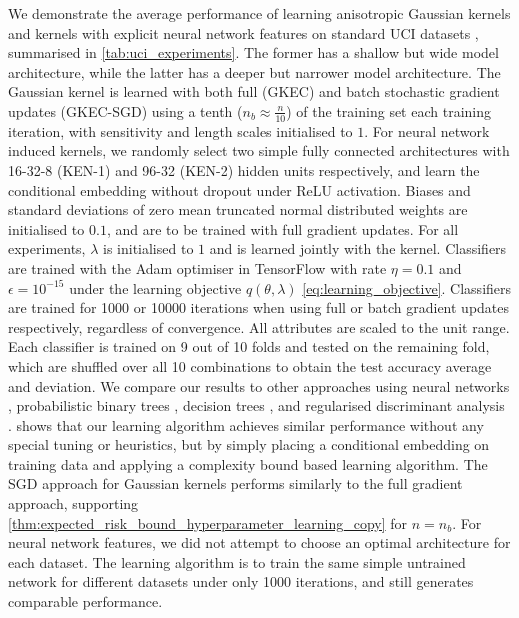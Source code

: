 \documentclass{article}
\begin{document}
		We demonstrate the average performance of learning anisotropic Gaussian kernels and kernels with explicit neural network features on standard UCI datasets \citep{merz1998uci}, summarised in \cref{tab:uci_experiments}. The former has a shallow but wide model architecture, while the latter has a deeper but narrower model architecture. The Gaussian kernel is learned with both full (GKEC) and batch stochastic gradient updates (GKEC-SGD) using a tenth ($n_{b} \approx \frac{n}{10}$) of the training set each training iteration, with sensitivity and length scales initialised to $1$. For neural network induced kernels, we randomly select two simple fully connected architectures with 16-32-8 (KEN-1) and 96-32 (KEN-2) hidden units respectively, and learn the conditional embedding without dropout under ReLU activation. Biases and standard deviations of zero mean truncated normal distributed weights are initialised to $0.1$, and are to be trained with full gradient updates. For all experiments, $\lambda$ is initialised to $1$ and is learned jointly with the kernel. Classifiers are trained with the Adam optimiser \citep{kingma2014adam} in TensorFlow \citep{abadi2016tensorflow} with rate $\eta = 0.1$ and $\epsilon = 10^{-15}$ under the learning objective $q(\theta, \lambda)$ \eqref{eq:learning_objective}. Classifiers are trained for 1000 or 10000 iterations when using full or batch gradient updates respectively, regardless of convergence. All attributes are scaled to the unit range. Each classifier is trained on 9 out of 10 folds and tested on the remaining fold, which are shuffled over all 10 combinations to obtain the test accuracy average and deviation. We compare our results to other approaches using neural networks \citep[a; c]{kaya2016banknote, freire2009short}, probabilistic binary trees \citep[b]{horton1996probabilistic}, decision trees \citep[d]{zhou2004size}, and regularised discriminant analysis \citep[e]{aeberhard1992comparison}.  shows that our learning algorithm achieves similar performance without any special tuning or heuristics, but by simply placing a conditional embedding on training data and applying a complexity bound based learning algorithm. The SGD approach for Gaussian kernels performs similarly to the full gradient approach, supporting \cref{thm:expected_risk_bound_hyperparameter_learning_copy} for $n = n_{b}$. For neural network features, we did not attempt to choose an optimal architecture for each dataset. The learning algorithm is to train the same simple untrained network for different datasets under only 1000 iterations, and still generates comparable performance. 
	
\end{document}

